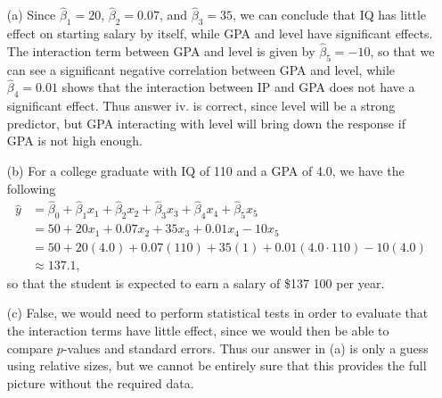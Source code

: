 
\begin{itemize}
    \item[(a)]
        Since $\hat{\beta}_1 = 20$, $\hat{\beta}_2 = 0.07$, and $\hat{\beta}_3 = 35$,
        we can conclude that IQ has little effect on starting salary by itself, while 
        GPA and level have significant effects. The interaction term between GPA and 
        level is given by $\hat{\beta}_5 = -10$, so that we can see a significant
        negative correlation between GPA and level, while $\hat{\beta}_4 = 0.01$ shows
        that the interaction between IP and GPA does not have a significant effect.
        Thus answer iv. is correct, since level will be a strong predictor, but GPA
        interacting with level will bring down the response if GPA is not high enough.
    \item[(b)]
        For a college graduate with IQ of 110 and a GPA of 4.0, we have the following
        \begin{equation*}
            \begin{split}
                \hat{y} &= \hat{\beta}_0 + \hat{\beta}_1 x_1 + \hat{\beta}_2 x_2 + 
                    \hat{\beta}_3 x_3 + \hat{\beta}_4 x_4 + \hat{\beta}_5 x_5 \\
                        &= 50 + 20 x_1 + 0.07x_2 + 35x_3 + 0.01x_4 - 10x_5 \\
                        &= 50 + 20(4.0) + 0.07(110) + 35(1) + 0.01(4.0 \cdot 110) 
                    - 10(4.0) \\
                        &\approx 137.1, 
            \end{split} 
        \end{equation*}
        so that the student is expected to earn a salary of \$137 100 per year.
    \item[(c)]
        False, we would need to perform statistical tests in order to evaluate that
        the interaction terms have little effect, since we would then be able to
        compare $p$-values and standard errors. Thus our answer in (a) is only
        a guess using relative sizes, but we cannot be entirely sure that this 
        provides the full picture without the required data.
\end{itemize}

